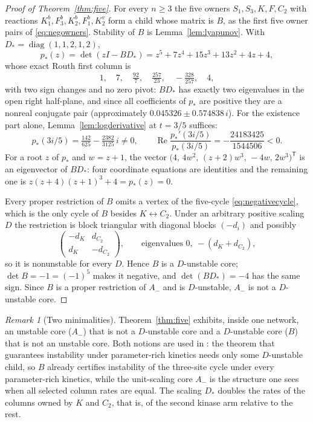 \documentclass[11pt,a4paper]{article}
\theoremstyle{plain}
\theoremstyle{definition}
\theoremstyle{remark}
\newtheorem{remark}[theorem]{Remark}
\newcommand{\Aminus}{A_{-}}
\newcommand{\T}{\mathsf T}
\DeclareMathOperator{\diag}{diag}
\DeclareMathOperator{\Ree}{Re}
\begin{document}
\begin{proof}[Proof of Theorem~\ref{thm:five}]
For every $n\ge3$ the five owners $S_1,S_3,K,F,C_2$ with reactions $K_1^b,F_3^b,K_2^b,F_1^b,K_2^v$ form a child whose matrix is $B$, as the first five owner pairs of \eqref{eq:negowners}. Stability of $B$ is Lemma~\ref{lem:lyapunov}. With $D_*=\diag(1,1,2,1,2)$,
\begin{equation}\label{eq:pstar}
p_*(z)=\det(zI-BD_*)=z^5+7z^4+15z^3+13z^2+4z+4 ,
\end{equation}
whose exact Routh first column is
\begin{equation}\label{eq:routhfive}
1,\quad 7,\quad \tfrac{92}{7},\quad \tfrac{257}{23},\quad -\tfrac{328}{257},\quad 4 ,
\end{equation}
with two sign changes and no zero pivot: $BD_*$ has exactly two eigenvalues in the open right half-plane, and since all coefficients of $p_*$ are positive they are a nonreal conjugate pair (approximately $0.045326\pm0.574838\,i$). For the existence part alone, Lemma~\ref{lem:logderivative} at $t=3/5$ suffices:
\begin{equation}\label{eq:fivecert}
p_*(3i/5)=\tfrac{142}{625}-\tfrac{2382}{3125}\,i\neq0,\qquad
\Ree\frac{p_*'(3i/5)}{p_*(3i/5)}=-\frac{24183425}{1544506}<0 .
\end{equation}
For a root $z$ of $p_*$ and $w=z+1$, the vector $\bigl(4,\,4w^2,\,(z+2)w^3,\,-4w,\,2w^3\bigr)^{\T}$ is an eigenvector of $BD_*$: four coordinate equations are identities and the remaining one is $z(z+4)(z+1)^3+4=p_*(z)=0$.

Every proper restriction of $B$ omits a vertex of the five-cycle \eqref{eq:negativecycle}, which is the only cycle of $B$ besides $K\leftrightarrow C_2$. Under an arbitrary positive scaling $D$ the restriction is block triangular with diagonal blocks $(-d_i)$ and possibly
\[
\begin{pmatrix}-d_K&d_{C_2}\\ d_K&-d_{C_2}\end{pmatrix},\qquad\text{eigenvalues } 0,\ -(d_K+d_{C_2}),
\]
so it is nonunstable for every $D$. Hence $B$ is a $D$-unstable core; $\det B=-1=(-1)^5$ makes it negative, and $\det(BD_*)=-4$ has the same sign. Since $B$ is a proper restriction of $\Aminus$ and is $D$-unstable, $\Aminus$ is not a $D$-unstable core.
\end{proof}

\begin{remark}[Two minimalities]
Theorem~\ref{thm:five} exhibits, inside one network, an unstable core ($\Aminus$) that is not a $D$-unstable core and a $D$-unstable core ($B$) that is not an unstable core. Both notions are used in \citep{VassenaStadler2024}: the theorem that guarantees instability under parameter-rich kinetics needs only some $D$-unstable child, so $B$ already certifies instability of the three-site cycle under every parameter-rich kinetics, while the unit-scaling core $\Aminus$ is the structure one sees when all selected column rates are equal. The scaling $D_*$ doubles the rates of the columns owned by $K$ and $C_2$, that is, of the second kinase arm relative to the rest.
\end{remark}
\end{document}

